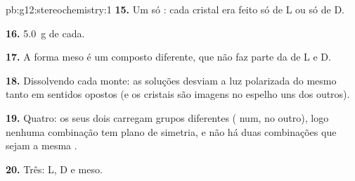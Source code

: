 \begin{solution}{pb:g12:stereochemistry:1}
\textbf{15.} Um só : cada cristal era feito só de L ou só de
D.

\textbf{16.} \qty{5.0}{g} de cada.

\textbf{17.} A forma meso é um composto diferente, que não faz parte da
 de L e D.

\textbf{18.} Dissolvendo cada monte: as soluções desviam a luz
polarizada do mesmo tanto em sentidos opostos (e os cristais são imagens
no espelho uns dos outros).

\textbf{19.} Quatro: os seus dois  carregam grupos
diferentes ( num,  no outro), logo nenhuma combinação tem
plano de simetria, e não há duas combinações que sejam a mesma .

\textbf{20.} Três: L, D e meso.
\end{solution}
